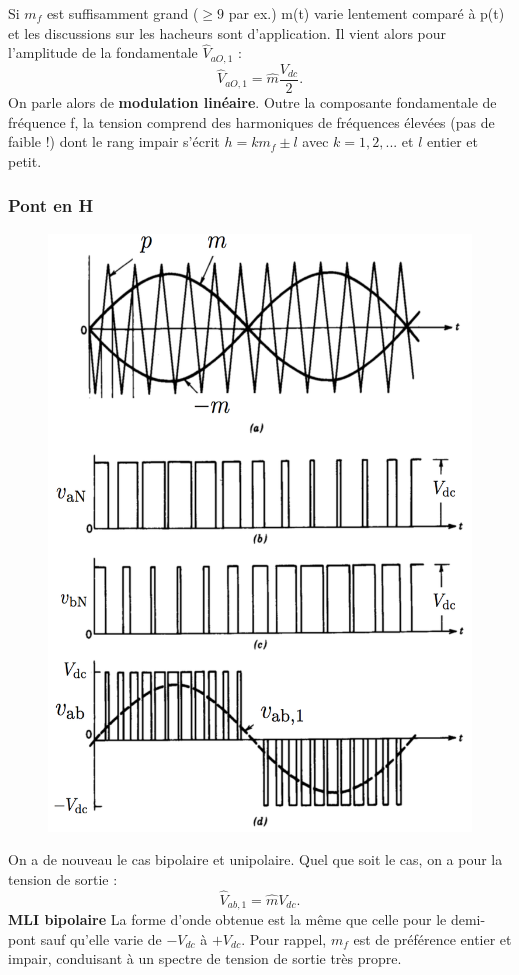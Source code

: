 			 Si $m_f$ est suffisamment grand ($\geq 9$ par ex.) m(t) varie lentement comparé à p(t) et les discussions sur les hacheurs sont d'application. Il vient alors pour l'amplitude de la fondamentale $\hat{V}_{aO,1}$ : 
			 \begin{equation}
			 	\hat{V}_{aO,1} = \hat{m}\frac{V_{dc}}{2}.
			 \end{equation}
			 On parle alors de \textbf{modulation linéaire}. Outre la composante fondamentale de fréquence f, la tension comprend des harmoniques de fréquences élevées (pas de faible !) dont le rang impair s'écrit $h = km_f \pm l$ avec $k=1,2,...$ et $l$ entier et petit. 
			\newpage
			
		\subsubsection{Pont en H}
			\begin{figure}
			\vspace{-5mm}
			\includegraphics[scale=0.28]{ch4/18}
			\end{figure}
			On a de nouveau le cas bipolaire et unipolaire. Quel que soit le cas, on a pour la tension de sortie :
			\begin{equation}
				\hat{V}_{ab,1} = \hat{m}V_{dc}. 
			\end{equation}
			\textbf{MLI bipolaire} \qquad La forme d'onde obtenue est la même que celle pour le demi-pont sauf qu'elle varie de $-V_{dc}$ à $+V_{dc}$. Pour rappel, $m_{f}$ est de préférence entier et impair, conduisant à un spectre de tension de sortie très propre. 
			
